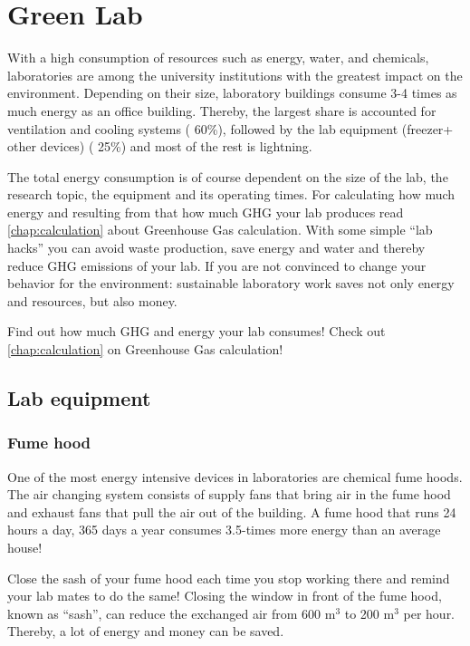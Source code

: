 
\chapter{Green Lab}\label{chap:lab}

With a high consumption of resources such as energy, water, and chemicals, laboratories are among the university institutions with the greatest impact on the environment. Depending on their size, laboratory buildings consume 3-4 times as much energy as an office building. Thereby, the largest share is accounted for ventilation and cooling systems (\raisebox{-0.9ex}{\~{ }} 60\%), followed by the lab equipment (freezer+ other devices) (\raisebox{-0.9ex}{\~{ }} 25\%) and most of the rest is lightning. \cite{GreenHarvard}

The total energy consumption is of course dependent on the size of the lab, the research topic, the equipment and its operating times. For calculating how much energy and resulting from that how much GHG your lab produces read \cref{chap:calculation} about Greenhouse Gas calculation. 
With some simple “lab hacks” you can avoid waste production, save energy and water and thereby reduce GHG emissions of your lab. 
If you are not convinced to change your behavior for the environment: sustainable laboratory work saves not only energy and resources, but also money.

\begin{suggest}{Find out how much GHG and energy your lab consumes!}
	Check out \cref{chap:calculation} on Greenhouse Gas calculation!
\end{suggest}

\section{Lab equipment}

\subsection{Fume hood}
One of the most energy intensive devices in laboratories are chemical fume hoods. The air changing system consists of supply fans that bring air in the fume hood and exhaust fans that pull the air out of the building.  A fume hood that runs 24 hours a day, 365 days a year consumes 3.5-times more energy than an average house! 

\begin{suggest}{Close the sash of your fume hood each time you stop working there and remind your lab mates to do the same!}
	Closing the window in front of the fume hood, known as “sash”, can reduce the exchanged air from 600 m$^{3}$ to 200 m$^{3}$ per hour. Thereby, a lot of energy and money can be saved.
\end{suggest}


